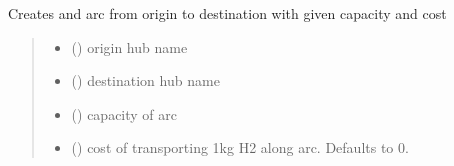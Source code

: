 \documentclass[letterpaper,10pt,english]{sphinxmanual}
\begin{document}
\begin{fulllineitems}

\begin{fulllineitems}
\label{\detokenize{src.models.hydrogen.network.grid:src.models.hydrogen.network.grid.Grid.create_arc}}
\pysigstartsignatures
\pysiglinewithargsret
{}
{\sphinxparamcomma {}\sphinxparamcomma {}\sphinxparamcomma {}}
{}
\pysigstopsignatures
\sphinxAtStartPar
Creates and arc from origin to destination with given capacity and cost
\begin{quote}\begin{description}
\begin{itemize}
\item {} 
\sphinxAtStartPar
{} () \textendash{} origin hub name

\item {} 
\sphinxAtStartPar
{} () \textendash{} destination hub name

\item {} 
\sphinxAtStartPar
{} () \textendash{} capacity of arc

\item {} 
\sphinxAtStartPar
{} (\sphinxstyleliteralemphasis{\sphinxupquote{, }}) \textendash{} cost of transporting 1kg H2 along arc. Defaults to 0.

\end{itemize}

\end{description}\end{quote}

\end{fulllineitems}



\end{fulllineitems}
\end{document}
